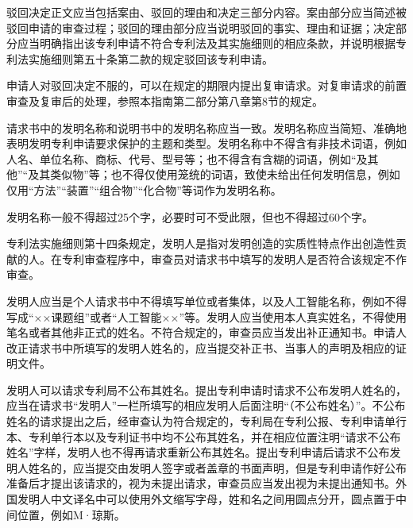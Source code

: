 驳回决定正文应当包括案由、驳回的理由和决定三部分内容。案由部分应当简述被驳回申请的审查过程；驳回的理由部分应当说明驳回的事实、理由和证据；决定部分应当明确指出该专利申请不符合专利法及其实施细则的相应条款，并说明根据专利法实施细则第五十条第二款的规定驳回该专利申请。

申请人对驳回决定不服的，可以在规定的期限内提出复审请求。对复审请求的前置审查及复审后的处理，参照本指南第二部分第八章第8节的规定。

请求书中的发明名称和说明书中的发明名称应当一致。发明名称应当简短、准确地表明发明专利申请要求保护的主题和类型。发明名称中不得含有非技术词语，例如人名、单位名称、商标、代号、型号等；也不得含有含糊的词语，例如“及其他”“及其类似物”等；也不得仅使用笼统的词语，致使未给出任何发明信息，例如仅用“方法”“装置”“组合物”“化合物”等词作为发明名称。

发明名称一般不得超过25个字，必要时可不受此限，但也不得超过60个字。

专利法实施细则第十四条规定，发明人是指对发明创造的实质性特点作出创造性贡献的人。在专利审查程序中，审查员对请求书中填写的发明人是否符合该规定不作审查。

发明人应当是个人请求书中不得填写单位或者集体，以及人工智能名称，例如不得写成“××课题组”或者“人工智能××”等。发明人应当使用本人真实姓名，不得使用笔名或者其他非正式的姓名。不符合规定的，审查员应当发出补正通知书。申请人改正请求书中所填写的发明人姓名的，应当提交补正书、当事人的声明及相应的证明文件。

发明人可以请求专利局不公布其姓名。提出专利申请时请求不公布发明人姓名的，应当在请求书“发明人”一栏所填写的相应发明人后面注明“（不公布姓名）”。不公布姓名的请求提出之后，经审查认为符合规定的，专利局在专利公报、专利申请单行本、专利单行本以及专利证书中均不公布其姓名，并在相应位置注明“请求不公布姓名”字样，发明人也不得再请求重新公布其姓名。提出专利申请后请求不公布发明人姓名的，应当提交由发明人签字或者盖章的书面声明，但是专利申请作好公布准备后才提出该请求的，视为未提出请求，审查员应当发出视为未提出通知书。外国发明人中文译名中可以使用外文缩写字母，姓和名之间用圆点分开，圆点置于中间位置，例如M·琼斯。

